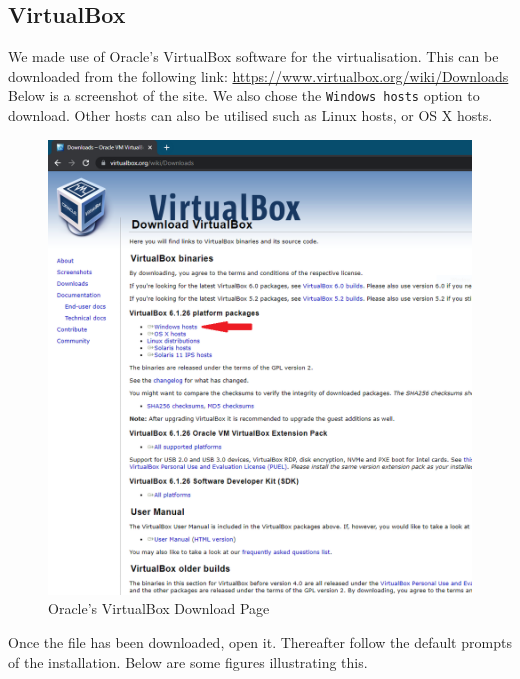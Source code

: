 \documentclass[a4paper, 12pt, titlepage]{report}
\begin{document}
\subsection{VirtualBox}
We made use of Oracle's VirtualBox software for the virtualisation. This can be downloaded from the following link: \url{https://www.virtualbox.org/wiki/Downloads}\\
Below is a screenshot of the site. We also chose the \texttt{Windows hosts} option to download. Other hosts can also be utilised such as Linux hosts, or OS X hosts.
\begin{figure}[H]
    \centering
    \includegraphics[scale=0.3]{pics/vbmain.PNG}
    \caption{Oracle's VirtualBox Download Page}
\end{figure}
Once the file has been downloaded, open it. Thereafter follow the default prompts of the installation. Below are some figures illustrating this.
\end{document}
